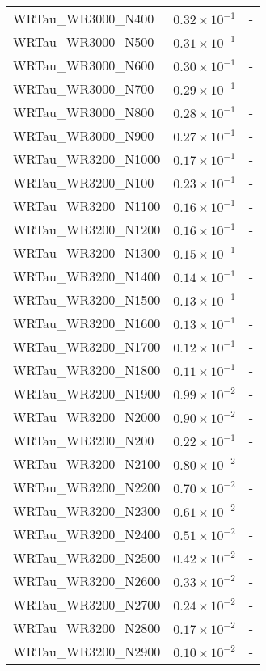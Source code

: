 \begin{longtable}[c]{| C{.35\textwidth} | C{.15\textwidth} | C{.1\textwidth}|}
    WRTau\_WR3000\_N400 & $0.32\times10^{-1}$ & - \\
    WRTau\_WR3000\_N500 & $0.31\times10^{-1}$ & - \\
    WRTau\_WR3000\_N600 & $0.30\times10^{-1}$ & - \\
    WRTau\_WR3000\_N700 & $0.29\times10^{-1}$ & - \\
    WRTau\_WR3000\_N800 & $0.28\times10^{-1}$ & - \\
    WRTau\_WR3000\_N900 & $0.27\times10^{-1}$ & - \\ \hline
    WRTau\_WR3200\_N1000 & $0.17\times10^{-1}$ & - \\
    WRTau\_WR3200\_N100 & $0.23\times10^{-1}$ & - \\
    WRTau\_WR3200\_N1100 & $0.16\times10^{-1}$ & - \\
    WRTau\_WR3200\_N1200 & $0.16\times10^{-1}$ & - \\
    WRTau\_WR3200\_N1300 & $0.15\times10^{-1}$ & - \\
    WRTau\_WR3200\_N1400 & $0.14\times10^{-1}$ & - \\
    WRTau\_WR3200\_N1500 & $0.13\times10^{-1}$ & - \\
    WRTau\_WR3200\_N1600 & $0.13\times10^{-1}$ & - \\
    WRTau\_WR3200\_N1700 & $0.12\times10^{-1}$ & - \\
    WRTau\_WR3200\_N1800 & $0.11\times10^{-1}$ & - \\
    WRTau\_WR3200\_N1900 & $0.99\times10^{-2}$ & - \\
    WRTau\_WR3200\_N2000 & $0.90\times10^{-2}$ & - \\
    WRTau\_WR3200\_N200 & $0.22\times10^{-1}$ & - \\
    WRTau\_WR3200\_N2100 & $0.80\times10^{-2}$ & - \\
    WRTau\_WR3200\_N2200 & $0.70\times10^{-2}$ & - \\
    WRTau\_WR3200\_N2300 & $0.61\times10^{-2}$ & - \\
    WRTau\_WR3200\_N2400 & $0.51\times10^{-2}$ & - \\
    WRTau\_WR3200\_N2500 & $0.42\times10^{-2}$ & - \\
    WRTau\_WR3200\_N2600 & $0.33\times10^{-2}$ & - \\
    WRTau\_WR3200\_N2700 & $0.24\times10^{-2}$ & - \\
    WRTau\_WR3200\_N2800 & $0.17\times10^{-2}$ & - \\
    WRTau\_WR3200\_N2900 & $0.10\times10^{-2}$ & - \\

\end{longtable}

